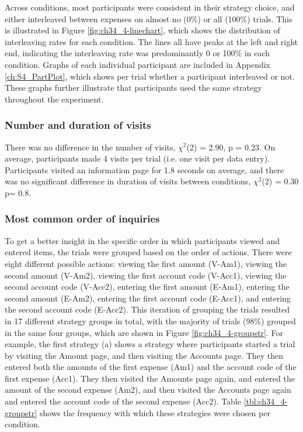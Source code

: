 Across conditions, most participants were consistent in their strategy choice, and either interleaved between expenses on almost no (0\%) or all (100\%) trials. This is illustrated in Figure \ref{fig:ch34_4-linechart}, which shows the distribution of interleaving rates for each condition. The lines all have peaks at the left and right end, indicating the interleaving rate was predominantly 0 or 100\% in each condition. Graphs of each individual participant are included in Appendix \ref{ch:S4_PartPlot}, which shows per trial whether a participant interleaved or not. These graphs further illustrate that participants used the same strategy throughout the experiment.

\subsubsection{Number and duration of visits}
There was no difference in the number of visits, $\chi^2$(2) = 2.90, p = 0.23. On average, participants made 4 visits per trial (i.e. one visit per data entry). Participants visited an information page for 1.8 seconds on average, and there was no significant difference in duration of visits between conditions, $\chi^2$(2) = 0.30 p= 0.8. 

\subsubsection{Most common order of inquiries}
To get a better insight in the specific order in which participants viewed and entered items, the trials were grouped based on the order of actions. There were eight different possible actions: viewing the first amount (V-Am1), viewing the second amount (V-Am2), viewing the first account code (V-Acc1), viewing the second account code (V-Acc2), entering the first amount (E-Am1), entering the second amount (E-Am2), entering the first account code (E-Acc1), and entering the second account code (E-Acc2). This iteration of grouping the trials resulted in 17 different strategy groups in total, with the majority of trials (98\%) grouped in the same four groups, which are shown in Figure \ref{fig:ch34_4-groupstr}. For example, the first strategy (a) shows a strategy where participants started a trial by visiting the Amount page, and then visiting the Accounts page. They then entered both the amounts of the first expense (Am1) and the account code of the first expense (Acc1). They then visited the Amounts page again, and entered the amount of the second expense (Am2), and then visited the Accounts page again and entered the account code of the second expense (Acc2). Table \ref{tbl:ch34_4-groupstr} shows the frequency with which these strategies were chosen per condition.

